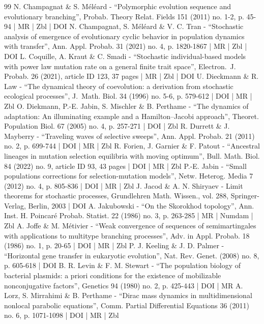 \begin{thebibliography}{99}
N. Champagnat \& S. Méléard - “Polymorphic evolution sequence and evolutionary branching”, Probab. Theory Relat. Fields 151 (2011) no. 1-2, p. 45-94 | MR | Zbl | DOI
N. Champagnat, S. Méléard \& V. C. Tran - “Stochastic analysis of emergence of evolutionary cyclic behavior in population dynamics with transfer”, Ann. Appl. Probab. 31 (2021) no. 4, p. 1820-1867 | MR | Zbl | DOI
L. Coquille, A. Kraut \& C. Smadi - “Stochastic individual-based models with power law mutation rate on a general finite trait space”, Electron. J. Probab. 26 (2021), article ID 123, 37 pages | MR | Zbl | DOI
U. Dieckmann \& R. Law - “The dynamical theory of coevolution: a derivation from stochastic ecological processes”, J. Math. Biol. 34 (1996) no. 5-6, p. 579-612 | DOI | MR | Zbl
O. Diekmann, P.-E. Jabin, S. Mischler \& B. Perthame - “The dynamics of adaptation: An illuminating example and a Hamilton–Jacobi approach”, Theoret. Population Biol. 67 (2005) no. 4, p. 257-271 | DOI | Zbl
R. Durrett \& J. Mayberry - “Traveling waves of selective sweeps”, Ann. Appl. Probab. 21 (2011) no. 2, p. 699-744 | DOI | MR | Zbl
R. Forien, J. Garnier \& F. Patout - “Ancestral lineages in mutation selection equilibria with moving optimum”, Bull. Math. Biol. 84 (2022) no. 9, article ID 93, 43 pages | DOI | MR | Zbl
P.-E. Jabin - “Small populations corrections for selection-mutation models”, Netw. Heterog. Media 7 (2012) no. 4, p. 805-836 | DOI | MR | Zbl
J. Jacod \& A. N. Shiryaev - Limit theorems for stochastic processes, Grundlehren Math. Wissen., vol. 288, Springer-Verlag, Berlin, 2003 | DOI
A. Jakubowski - “On the Skorokhod topology”, Ann. Inst. H. Poincaré Probab. Statist. 22 (1986) no. 3, p. 263-285 | MR | Numdam | Zbl
A. Joffe \& M. Métivier - “Weak convergence of sequences of semimartingales with applications to multitype branching processes”, Adv. in Appl. Probab. 18 (1986) no. 1, p. 20-65 | DOI | MR | Zbl
P. J. Keeling \& J. D. Palmer - “Horizontal gene transfer in eukaryotic evolution”, Nat. Rev. Genet. (2008) no. 8, p. 605-618 | DOI
B. R. Levin \& F. M. Stewart - “The population biology of bacterial plasmids: a priori conditions for the existence of mobilizable nonconjugative factors”, Genetics 94 (1980) no. 2, p. 425-443 | DOI | MR
A. Lorz, S. Mirrahimi \& B. Perthame - “Dirac mass dynamics in multidimensional nonlocal parabolic equations”, Comm. Partial Differential Equations 36 (2011) no. 6, p. 1071-1098 | DOI | MR | Zbl

\end{thebibliography}
